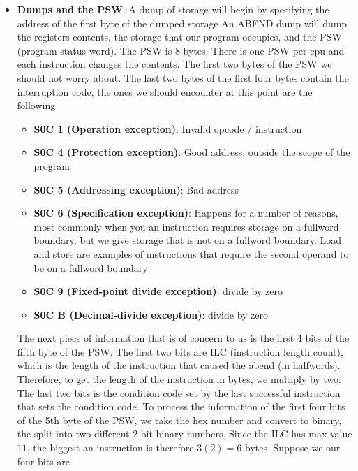 \documentclass{report}
\begin{document}
\begin{itemize}
                \item \textbf{Dumps and the PSW}: A dump of storage will begin by specifying the address of the first byte of the dumped storage
                    \bigbreak \noindent 
                    An ABEND dump will dump the registers contents, the storage that our program occupies, and the PSW (program status word). The PSW is 8 bytes. There is one PSW per cpu and each instruction changes the contents. 
                    \bigbreak \noindent 
                    The first two bytes of the PSW we should not worry about. The last two bytes of the first four bytes contain the interruption code, the ones we should encounter at this point are the following
                    \begin{itemize}
                        \item \textbf{S0C 1 (Operation exception)}: Invalid opcode / instruction
                        \item \textbf{S0C 4 (Protection exception)}: Good address, outside the scope of the program
                        \item \textbf{S0C 5 (Addressing exception)}: Bad address
                        \item \textbf{S0C 6 (Specification exception)}: Happens for a number of reasons, most commonly when you an instruction requires storage on a fullword boundary, but we give storage that is not on a fullword boundary. Load and store are examples of instructions that require the second operand to be on a fullword boundary
                        \item \textbf{S0C 9 (Fixed-point divide exception)}: divide by zero
                        \item \textbf{S0C B (Decimal-divide exception)}: divide by zero
                    \end{itemize}
                    \bigbreak \noindent 
                    The next piece of information that is of concern to us is the first 4 bits of the fifth byte of the PSW. The first two bits are ILC (instruction length count), which is the length of the instruction that caused the abend (in halfwords). Therefore, to get the length of the instruction in bytes, we multiply by two. The last two bits is the condition code set by the last successful instruction that sets the condition code. 
                    \bigbreak \noindent 
                    To process the information of the first four bits of the 5th byte of the PSW, we take the hex number and convert to binary, the split into two different 2 bit binary numbers. Since the ILC has max value $11$, the biggest an instruction is therefore $3(2) = 6$ bytes. Suppose we our four bits are

\end{itemize}
\end{document}
